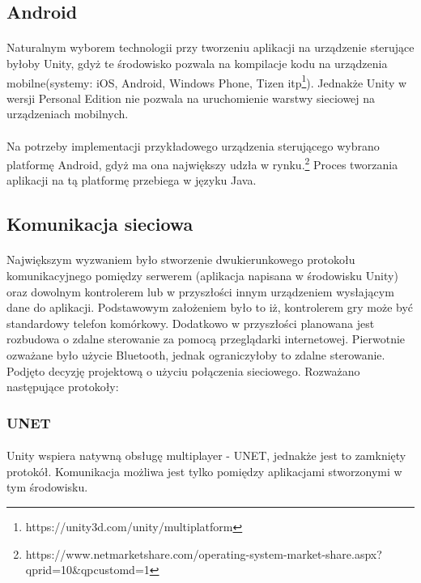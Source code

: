 \subsection{Android}
\paragraph{}
Naturalnym wyborem technologii przy tworzeniu aplikacji na urządzenie sterujące byłoby Unity, gdyż te środowisko pozwala na kompilacje kodu na urządzenia mobilne(systemy: iOS, Android, Windows Phone, Tizen itp\footnote{https://unity3d.com/unity/multiplatform}). Jednakże Unity w wersji Personal Edition nie pozwala na uruchomienie warstwy sieciowej na urządzeniach mobilnych.
\paragraph{}
Na potrzeby implementacji przykładowego urządzenia sterującego wybrano platformę Android, gdyż ma ona największy udzła w rynku.\footnote{https://www.netmarketshare.com/operating-system-market-share.aspx?qprid=10\&qpcustomd=1} Proces tworzania aplikacji na tą platformę przebiega w języku Java.

\subsection{Komunikacja sieciowa}
\paragraph{}
Największym wyzwaniem było stworzenie dwukierunkowego protokołu komunikacyjnego pomiędzy serwerem (aplikacja napisana w środowisku Unity) oraz dowolnym kontrolerem lub w przyszłości innym urządzeniem wysłającym dane do aplikacji. Podstawowym założeniem było to iż, kontrolerem gry może być standardowy telefon komórkowy. Dodatkowo w przyszłości planowana jest rozbudowa o zdalne sterowanie za pomocą przeglądarki internetowej. Pierwotnie ozważane było użycie Bluetooth, jednak ograniczyłoby to zdalne sterowanie. Podjęto decyzję projektową o użyciu połączenia sieciowego. Rozważano następujące protokoły:

\subsubsection{UNET}
\paragraph{}
Unity wspiera natywną obsługę multiplayer - UNET, jednakże jest to zamknięty protokół. Komunikacja możliwa jest tylko pomiędzy aplikacjami stworzonymi w tym środowisku.

